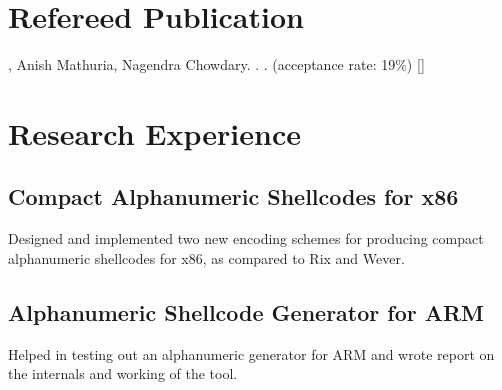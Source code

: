 \documentclass[]{deedy}
\begin{document}
\hfill
\begin{minipage}[t]{0.66\textwidth} 


\section{Refereed Publication}
\vspace{\topsep} %
\begin{tightemize}\item {}, Anish Mathuria, Nagendra Chowdary. \href{https://dl.dropboxusercontent.com/u/9020146/resources/alpha-x86.pdf}{}. . (acceptance rate: 19\%) [\href{https://dl.dropboxusercontent.com/u/9020146/resources/ppt/alpha-x86.pdf}{}]
\end{tightemize}


\section{Research Experience}

\subsection{Compact Alphanumeric Shellcodes for x86}
\begin{tightemize}
\item Designed and implemented two new encoding schemes for producing compact alphanumeric shellcodes for x86, as compared to Rix and Wever.
\end{tightemize}
\sectionsep

\subsection{Alphanumeric Shellcode Generator for ARM}
\begin{tightemize}
\item Helped in testing out an alphanumeric generator for ARM and wrote report on the internals and working of the tool.
\end{tightemize}
\sectionsep


\end{minipage}
\end{document}
